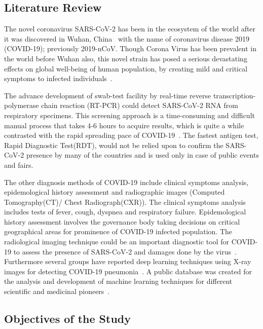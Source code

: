 \subsection{Literature Review}
 The novel coronavirus SARS-CoV-2 has been in the ecosystem of the world after it was discovered in Wuhan, China~\cite{Velavan2020} with the name of coronavirus disease 2019 (COVID-19); previously 2019-nCoV. Though Corona Virus has been prevalent in the world before Wuhan also, this novel strain has posed a serious devastating effects on global well-being of human population, by creating mild and critical symptoms to infected individuals~\cite{Tomar2021}.

 The advance development of swab-test facility by real-time reverse transcription-polymerase chain reaction (RT-PCR) could detect SARS-CoV-2 RNA from respiratory specimens. This screening approach is a time-consuming and difficult manual process that takes 4-6 hours to acquire results, which is quite a while contrasted with the rapid spreading pace of COVID-19~\cite{Chaudhary2020}. The fastest antigen test, Rapid Diagnostic Test(RDT), would not be relied upon to confirm the SARS-CoV-2 presence by many of the countries and is used only in case of public events and fairs.

 The other diagnosis methods of COVID-19 include clinical symptoms analysis, epidemological history assessment and radiographic images (Computed Tomography(CT)/ Chest Radiograph(CXR)). The clinical symptoms analysis includes tests of fever, cough, dyspnea and respiratory failure. Epidemological history assessment involves the governance body taking decisions on critical geographical areas for prominence of COVID-19 infected population. The radiological imaging technique could be an important diagnostic tool for COVID-19 to assess the presence of SARS-CoV-2 and damages done by the virus~\cite{Chaudhary2020}. Furthermore several groups have reported deep learning techniques using X-ray images for detecting COVID-19 pneumonia~\cite{bbb632134fb693b2dc6bd3b7123c82f0a141e0a0}. A public database was created for the analysis and development of machine learning techniques for different scientific and medicinal pioneers~\cite{wang2020cord}.


\subsection{Objectives of the Study}

